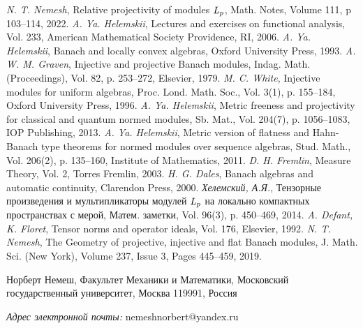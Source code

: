 \documentclass[12pt]{article}
\begin{document}
\begin{thebibliography}{999}
    \textit{N. T. Nemesh}, Relative projectivity of 
    modules $\it{L_p}$, Math. Notes, Volume 111, p 103--114, 2022.
    \textit{A. Ya. Helemskii}, Lectures and 
    exercises on functional analysis, Vol. 233, 
    American Mathematical Society Providence, RI, 2006.
    \textit{A. Ya. Helemskii}, Banach and locally 
    convex algebras, Oxford University Press, 1993.
    \textit{A. W. M. Graven}, Injective and 
    projective Banach modules, Indag. Math. (Proceedings), Vol. 82, p. 253--272,
    Elsevier, 1979.
    \textit{M. C. White}, Injective modules for uniform 
    algebras, Proc. Lond. Math. Soc., Vol. 3(1), p. 155--184, Oxford University 
    Press, 1996.
    \textit{A. Ya. Helemskii}, Metric freeness and 
    projectivity for classical and quantum normed modules, Sb. Mat., 
    Vol. 204(7), p. 1056--1083, IOP Publishing, 2013.
    \textit{A. Ya. Helemskii}, Metric version of 
    flatness and Hahn-Banach type theorems for normed modules over sequence 
    algebras, Stud. Math., Vol. 206(2), p. 135--160, Institute of Mathematics, 
    2011.
    \textit{D. H. Fremlin}, Measure Theory, Vol. 2,
    Torres Fremlin, 2003.
    \textit{H. G. Dales}, Banach algebras and 
    automatic continuity, Clarendon Press, 2000.
    \textit{Хелемский, А.Я.}, Тензорные 
    произведения и мультипликаторы модулей $\it{L_p}$ на локально компактных 
    пространствах с мерой, Матем. заметки, Vol. 96(3), p. 450--469, 2014.
    \textit{A. Defant, K. Floret}, Tensor norms and 
    operator ideals, Vol. 176, Elsevier, 1992.
    \textit{N. T. Nemesh}, The Geometry of 
    projective, injective and flat Banach modules, J. Math. Sci. (New York), 
    Volume 237, Issue 3, Pages 445–459, 2019.
\end{thebibliography}

Норберт Немеш, Факультет Механики и Математики, Московский государственный 
университет, Москва 119991, Россия

\textit{Адрес электронной почты:} nemeshnorbert@yandex.ru
\end{document}
